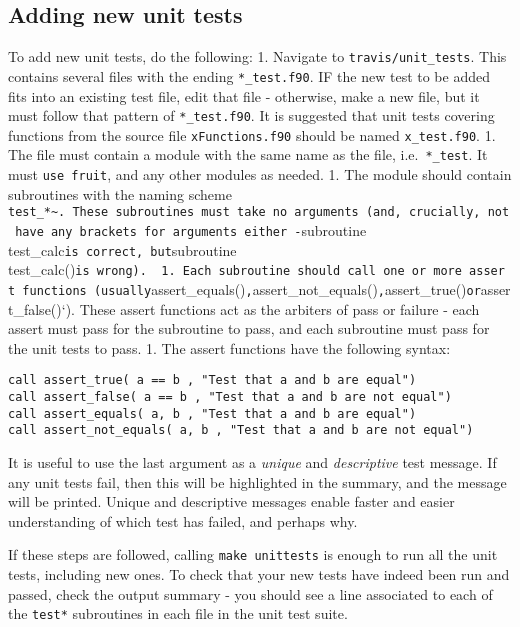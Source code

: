 \hypertarget{adding-new-unit-tests}{%
\subsection{Adding new unit tests}\label{adding-new-unit-tests}}

To add new unit tests, do the following: 1. Navigate to
\texttt{travis/unit\_tests}. This contains several files with the ending
\texttt{*\_test.f90}. IF the new test to be added fits into an existing
test file, edit that file - otherwise, make a new file, but it must
follow that pattern of \texttt{*\_test.f90}. It is suggested that unit
tests covering functions from the source file \texttt{xFunctions.f90}
should be named \texttt{x\_test.f90}. 1. The file must contain a module
with the same name as the file, i.e.~\texttt{*\_test}. It must
\texttt{use\ fruit}, and any other modules as needed. 1. The module
should contain subroutines with the naming scheme
\texttt{test\_*\textasciitilde{}.\ These\ subroutines\ must\ take\ no\ arguments\ (and,\ crucially,\ not\ have\ any\ brackets\ for\ arguments\ either\ -}subroutine
test\_calc\texttt{is\ correct,\ but}subroutine
test\_calc()\texttt{is\ wrong).\ \ 1.\ Each\ subroutine\ should\ call\ one\ or\ more\ assert\ functions\ (usually}assert\_equals()\texttt{,}assert\_not\_equals()\texttt{,}assert\_true()\texttt{or}assert\_false()`).
These assert functions act as the arbiters of pass or failure - each
assert must pass for the subroutine to pass, and each subroutine must
pass for the unit tests to pass. 1. The assert functions have the
following syntax:

\begin{verbatim}
call assert_true( a == b , "Test that a and b are equal")
call assert_false( a == b , "Test that a and b are not equal")
call assert_equals( a, b , "Test that a and b are equal")
call assert_not_equals( a, b , "Test that a and b are not equal")
\end{verbatim}

It is useful to use the last argument as a \emph{unique} and
\emph{descriptive} test message. If any unit tests fail, then this will
be highlighted in the summary, and the message will be printed. Unique
and descriptive messages enable faster and easier understanding of which
test has failed, and perhaps why.

If these steps are followed, calling \texttt{make\ unittests} is enough
to run all the unit tests, including new ones. To check that your new
tests have indeed been run and passed, check the output summary - you
should see a line associated to each of the \texttt{test*} subroutines
in each file in the unit test suite.

